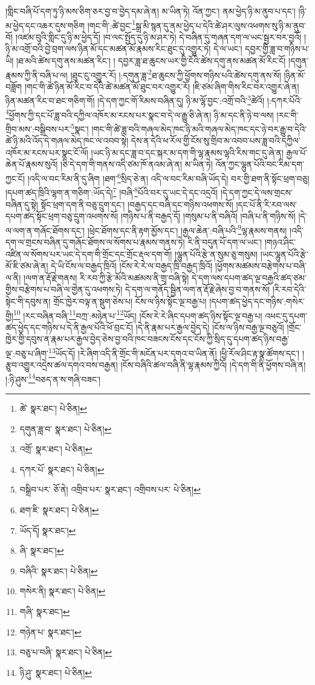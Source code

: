 །གླིང་བཞི་པོ་དག་ཏུ་ཉི་མས་ཅིག་ཅར་བྱ་བ་བྱེད་དམ་ཞེ་ན། མ་ཡིན་ཏེ། འོན་ཀྱང་། ནམ་ཕྱེད་ཉི་མ་ནུབ་པ་དང་། །ཉི་མ་ཕྱེད་དང་འཆར་དུས་གཅིག །གང་གི་:ཚེ་བྱང་\footnote{ཚེ་  སྣར་ཐང་།  པེ་ཅིན། }སྒྲ་མི་སྙན་དུ་ནམ་ཕྱེད་པ་དེའི་ཚེ་ཤར་ལུས་འཕགས་སུ་ཉི་མ་ནུབ་བོ། །འཛམ་བུའི་གླིང་དུ་ཉི་མ་ཕྱེད་དོ། །བ་ལང་སྤྱོད་དུ་ཉི་མ་ཤར་ཏེ། དེ་བཞིན་དུ་གཞན་དག་ལ་ཡང་སྦྱར་བར་བྱའོ། །ཉི་མ་འགྲོ་བའི་བྱེ་བྲག་ལས་ཉིན་མོ་དང་མཚན་མོ་རྣམས་རིང་ཐུང་དུ་འགྱུར་ཏེ། དེ་ལ་ཡང་། དབྱར་གྱི་ཟླ་བ་གཉིས་པ་ཡི། །ཐ་མའི་ཚེས་དགུ་ནས་མཚན་རིང་། །
དབྱར་ཟླ་ཐ་ཆུངས་ཡར་གྱི་ངོའི་ཚེས་དགུ་ནས་མཚན་མོ་རིང་ངོ། །དགུན་རྣམས་ཀྱི་ནི་བཞི་པ་ལ། །ཐུང་ངུ་འགྱུར་རོ། །:དགུན་ཟླ་\footnote{དགུན་ཟླ་བ་  སྣར་ཐང་།  པེ་ཅིན། }ཐ་ཆུངས་ཀྱི་ཕྱོགས་གཉིས་པའི་ཚེས་དགུ་ནས་སོ། །ཉིན་མོ་བཟློག །གང་གི་ཚེ་ཉིན་མོ་རིང་བ་དེའི་ཚེ་མཚན་མོ་ཐུང་བར་འགྱུར་རོ། །ཇི་ཙམ་ཞིག་གིས་རིང་བར་འགྱུར་ཞེ་ན། ཉིན་མཚན་རིང་བ་ཐང་གཅིག་གོ། །དེ་དག་ཀྱང་གོ་རིམས་བཞིན་དུ། ཉི་མ་ལྷོ་བྱང་:འགྲོ་བའི་\footnote{འགྲོ་  སྣར་ཐང་།  པེ་ཅིན། }ཚེའོ། །:དཀར་པོའི་\footnote{དཀར་པོ་  སྣར་ཐང་།  པེ་ཅིན། }ཕྱོགས་ཀྱི་དང་པོ་ཟླ་བའི་དཀྱིལ་འཁོར་མ་རངས་པར་སྣང་བ་དེ་ལ་རྒྱུ་ཅི་ཞེ་ན། ཉི་མ་དང་ནི་ཉེ་བ་ལས། །རང་གི་གྲིབ་མས་:བསྒྲིབས་པར་\footnote{བསྒྲིབ་པར་  ཅོ་ནེ། འགྲིབ་པར་  སྣར་ཐང་། འགྲིབས་པར་  པེ་ཅིན། }སྣང་། །གང་གི་ཚེ་ཟླ་བའི་གཞལ་མེད་ཁང་ཉི་མའི་གཞལ་མེད་ཁང་དང་ཉེ་བར་རྒྱུ་བ་དེའི་ཚེ་ཉི་མའི་འོད་དེ་གཞལ་མེད་ཁང་ལ་འབབ་སྟེ། དེས་ན་དེའི་ཕ་རོལ་གྱི་ངོས་སུ་གྲིབ་མ་འབབ་པས་ཟླ་བའི་དཀྱིལ་འཁོར་མ་རངས་པར་སྣང་ངོ་ལོ། །ཡང་ཉི་མ་དང་ཟླ་བ་དང་སྐར་མ་དག་གི་ལྷ་རྣམས་ལྷའི་རིས་གང་དུ་ཞེ་ན། རྒྱལ་པོ་ཆེན་པོ་རྣམས་སུའོ། །ཅི་དེ་དག་གི་གནས་འདི་ཙམ་ཁོ་ནའམ་ཞེ་ན། མ་ཡིན་ཏེ། འོན་ཀྱང་ལྷུན་པོའི་བང་རིམ་དག་ཀྱང་ངོ། །འདི་ལ་བང་རིམ་ནི་དུ་ཞིག །ཐག་\footnote{ཐག་ཇི་  སྣར་ཐང་།  པེ་ཅིན། }སྲིད་ཅེ་ན། འདི་ལ་བང་རིམ་བཞི་ཡོད་དེ། བར་གྱི་ཐག་ནི་སྟོང་ཕྲག་བཅུ། །དཔག་ཚད་ཁྲིའི་ལྷག་ན་གཅིག་:ཡོད་དེ།\footnote{ཡོད་དོ།  སྣར་ཐང་། } །བཞི་\footnote{ཞི་  སྣར་ཐང་། }པོའི་བར་དུ་ཡང་དེ་དང་འདྲའོ། །དེ་དག་ཀྱང་དེ་ལས་གྲངས་བཞིན་དུ་སྟེ། སྟོང་ཕྲག་དག་ནི་བཅུ་དྲུག་དང་། །བརྒྱད་དང་བཞི་དང་གཉིས་འཕགས་སོ། །དང་པོ་ནི་རི་རབ་ལས་དཔག་ཚད་སྟོང་ཕྲག་བཅུ་དྲུག་འཕགས་སོ། །གཉིས་པ་ནི་བརྒྱད་དོ། །གསུམ་པ་ནི་བཞིའོ། །བཞི་པ་ནི་གཉིས་སོ། །དེ་ལ་ལག་ན་གཞོང་ཐོགས་དང་། །ཕྲེང་ཐོགས་དང་ནི་རྟག་མྱོས་དང་། །རྒྱལ་ཆེན་:བཞི་པའི་\footnote{བཞིའི་  སྣར་ཐང་།  པེ་ཅིན། }ལྷ་རྣམས་གནས། །འདི་དག་ལ་གྲངས་བཞིན་དུ་གཞོང་ཐོགས་ལ་སོགས་པ་རྣམས་གནས་ཏེ། རི་ནི་བདུན་པོ་དག་ལ་ཡང་། །གཉའ་ཤིང་འཛིན་ལ་སོགས་པར་ཡང་དེ་དག་གི་གྲོང་དང་གྲོང་རྡལ་དག་གོ། །ལྷུན་པོའི་རྩེ་ན་སུམ་ཅུ་གསུམ། །ཡང་ལྷུན་པོའི་རྩེ་མོ་ཇི་ཙམ་ཞེ་ན། དེ་ཡི་ངོས་ལ་བརྒྱད་ཁྲིའོ། །ངོས་རེ་རེ་ལ་བརྒྱད་ཁྲི་བརྒྱད་ཁྲིའོ། །ཕྱོགས་མཚམས་བརྩེགས་པ་བཞི་ལ་ནི། །ལག་ན་རྡོ་རྗེ་གནས། རི་རབ་ཀྱི་རྩེ་མོའི་མཚམས་ནི་གྲྭ་བཞི་སྟེ། དེ་དག་ལས་དཔག་ཚད་ལྔ་བརྒྱའི་ཚད་ཙམ་གྱིས་བརྩེགས་པ་བཞི་ལ་གྱེན་དུ་འཕགས་ཏེ། དེ་དག་ལ་གནོད་སྦྱིན་ལག་ན་རྡོ་རྗེ་ཞེས་བྱ་བ་གནས་སོ། །རི་རབ་དེའི་སྟེང་གི་དབུས་ན། གྲོང་ཁྱེར་བལྟ་ན་སྡུག་ཅེས་པ། ངོས་ལ་ཉིས་སྟོང་ལྔ་བརྒྱ་པ། །དཔག་ཚད་ཕྱེད་དང་གཉིས་:གསེར་གྱི།\footnote{གསེར་ནི།  སྣར་ཐང་།  པེ་ཅིན། } །རང་བཞིན་བཞི་\footnote{གཞི་  སྣར་ཐང་། }བཀྲ་:མཉེན་པ་\footnote{གཉེན་པ་  སྣར་ཐང་། }ཡོད། །ངོས་རེ་རེ་ཞིང་དཔག་ཚད་ཉིས་སྟོང་ལྔ་བརྒྱ་པ། འཕང་དུ་དཔག་ཚད་ཕྱེད་དང་གཉིས་པ་དེ་ནི་རྒྱལ་པོའི་ཕོ་བྲང་ངོ། །དེ་ནི་རྣམ་པར་རྒྱལ་བྱེད་དེ། །ངོས་ལ་ཉིས་བརྒྱ་ལྔ་བཅུའོ། །གྲོང་ཁྱེར་གྱི་དབུས་ན་རྣམ་པར་རྒྱལ་བྱེད་ཅེས་བྱ་བའི་ཁང་བཟངས་ངོས་དང་ངོས་ཀྱི་སྲིད་དུ་དཔག་ཚད་ཉིས་བརྒྱ་ལྔ་:བཅུ་པ་ཞིག་\footnote{བཅུ་པ་བཞི་  སྣར་ཐང་།  པེ་ཅིན། }ཡོད་དོ། །རེ་ཞིག་འདི་ནི་གྲོང་གི་མངོན་པར་དགའ་བ་ཡིན་ནོ། །ཕྱི་རོལ་ཤིང་རྟ་སྣ་ཚོགས་དང་། །རྩུབ་འགྱུར་འདྲེས་ཚལ་དགའ་བས་བརྒྱན། །ངོས་བཞིའི་ཚལ་བཞི་ནི་ལྷ་རྣམས་ཀྱིའོ། །དེ་དག་གི་ནི་ཕྱོགས་བཞི་ན། །:ཉི་ཤུས་\footnote{ཉི་ཤུ་  སྣར་ཐང་།  པེ་ཅིན། }བཅད་ན་ས་གཞི་བཟང་། 